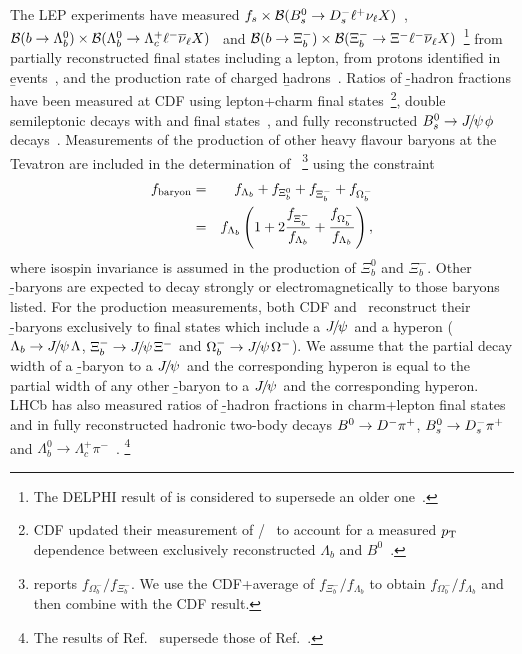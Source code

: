 The LEP experiments have measured
$f_{s} \times {\cal B}(B^0_s\to D_s^- \ell^+ \nu_\ell \mbox{$X$})$~\cite{Abreu:1992rv,*Acton:1992zq,*Buskulic:1995bd}, 
$\BR{\b\to\Lb} \times \BR{\Lb\to\Lc\ell^-\bar{\nu}_\ell \mbox{$X$}}$~\cite{Abreu:1995me,Barate:1997if}
and ${\cal B}(b\to\Xi_b^-) \times {\cal B}(\Xi_b^- \to \Xi^-\ell^-\overline\nu_\ell 
\mbox{$X$})$~\cite{Buskulic:1996sm,Abdallah:2005cw}\footnote{
  \label{foot:life_mix:Abdallah:2005cw}
  The DELPHI result of  is considered to supersede an older one~\cite{Abreu:1995kt}.
} 
from partially reconstructed final states including a lepton, \fbb
from protons identified in \b events~\cite{Barate:1997ty}, and the 
production rate of charged \b hadrons~\cite{Abdallah:2003xp}. 
Ratios of \b-hadron fractions have been measured at CDF using 
lepton+charm final 
states~\cite{Affolder:1999iq,Aaltonen:2008zd,Aaltonen:2008eu}\footnote{
  \label{foot:life_mix:Affolder:1999iq}
  CDF updated their measurement of \fLb/\fBd~\cite{Affolder:1999iq} to account 
  for a measured $p_{\rm T}$ dependence between exclusively reconstructed 
  $\Lambda_b$ and $B^0$~\cite{Aaltonen:2008eu}.
}, double semileptonic decays 
with  and \particle{\phi\mu\mu}
final states~\cite{Abe:1999ta},
and fully reconstructed $B^0_s\to{J\mskip -3mu/\mskip -2mu\psi\mskip 2mu}\phi$ decays~\cite{CDFnote10795:2012}.
Measurements of the production of other heavy 
flavour baryons at the Tevatron are included in the determination of 
\fbb~\cite{Abazov_mod:2007ub,Abazov:2008qm,Aaltonen:2009ny}\footnote{
  \label{foot:life_mix:Abazov:2008qm}
  \dzero reports $f_{\Omega_b^-}/f_{\Xi_b^-}$.  We use the CDF+\dzero average of 
  $f_{\Xi_b^-}/f_{\Lambda_b}$ to obtain $f_{\Omega_b^-}/f_{\Lambda_b}$ and then 
  combine with the CDF result.
} using the constraint
\begin{eqnarray}
f_{\rm baryon} & = & f_{\Lambda_b} + f_{\Xi_b^0} + f_{\Xi_b^-} + f_{\Omega_b^-} 
     \nonumber \\
     & = & f_{\Lambda_b}\left(1 + 2\frac{f_{\Xi_b^-}}{f_{\Lambda_b}} 
           + \frac{f_{\Omega_b^-}}{f_{\Lambda_b}}\right),
\end{eqnarray}
where isospin invariance is assumed in the production of $\Xi_b^0$ and 
$\Xi_b^-$. Other \b-baryons are expected to decay strongly or 
electromagnetically to those baryons listed. For the production 
measurements, both CDF and \dzero\ reconstruct their \b-baryons exclusively 
to final states which include a ${J\mskip -3mu/\mskip -2mu\psi\mskip 2mu}$ and a hyperon 
($\Lambda_b\rightarrow {J\mskip -3mu/\mskip -2mu\psi\mskip 2mu} \Lambda$, 
$\Xi_b^- \rightarrow {J\mskip -3mu/\mskip -2mu\psi\mskip 2mu} \Xi^-$ and 
$\Omega_b^- \rightarrow {J\mskip -3mu/\mskip -2mu\psi\mskip 2mu} \Omega^-$).  
We assume that the partial decay width of a \b-baryon to a ${J\mskip -3mu/\mskip -2mu\psi\mskip 2mu}$ and the 
corresponding hyperon is equal to the partial width of any other \b-baryon to 
a ${J\mskip -3mu/\mskip -2mu\psi\mskip 2mu}$ and the corresponding hyperon.  LHCb has also measured
ratios of \b-hadron fractions in charm+lepton final states~\cite{Aaij:2011jp} 
and in fully reconstructed hadronic two-body decays $B^0 \to D^-\pi^+$, $B^0_s \to D_s^- \pi^+$ and 
$\Lambda_b^0 \to \Lambda_c^+ \pi^-$~\cite{Aaij:2013qqa,Aaij:2014jyk}.%
\footnote{
  \label{foot:life_mix:Aaij:2013qqa}
  The results of Ref.~\cite{Aaij:2013qqa} supersede those of Ref.~\cite{Aaij:2011hi}.
}

